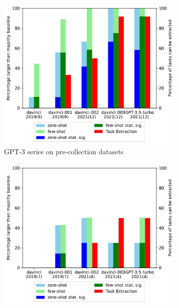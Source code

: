 \documentclass[letterpaper]{article} %
\begin{document}
\begin{figure}[t]
        \centering
        \begin{subfigure}[b]{0.45\textwidth}
            \centering
            \includegraphics[scale=0.45]{img/old-dataset-percentage.pdf}
            \caption[]%
            {GPT-3 series on pre-collection datasets}
            \label{fig:Zero shot performance for old datasets1}
        \end{subfigure}
        \begin{subfigure}[b]{0.45\textwidth}
            \centering
            \includegraphics[scale=0.45]{img/new-dataset-percentage.pdf}

\end{subfigure}
\end{figure}
\end{document}

